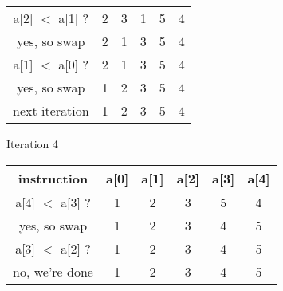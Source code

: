 \documentclass[12pt]{article}
\newenvironment{problem}[2][Problem]{\begin{trivlist}
\item[\hskip \labelsep {\bfseries #1}\hskip \labelsep {\bfseries #2.}]}{\end{trivlist}}
\begin{document}
\begin{problem}{3}
\begin{center}
\begin{tabular}{|c | c c c c c|}
        a[2] $<$ a[1] ? & 2 & 3 & 1 & 5 & 4 \\ 
        yes, so swap & 2 & 1 & 3 & 5 & 4 \\
        a[1] $<$ a[0] ? & 2 & 1 & 3 & 5 & 4 \\ 
        yes, so swap & 1 & 2 & 3 & 5 & 4 \\
        next iteration & 1 & 2 & 3 & 5 & 4 \\
        \hline
    \end{tabular}
\end{center}
Iteration 4
\begin{center}
    \begin{tabular}{|c | c c c c c|} 
        \hline
        instruction & a[0] & a[1] & a[2] & a[3] & a[4]\\
        \hline
        a[4] $<$ a[3] ? & 1 & 2 & 3 & 5 & 4 \\
        yes, so swap & 1 & 2 & 3 & 4 & 5 \\
        a[3] $<$ a[2] ? & 1 & 2 & 3 & 4 & 5 \\
        no, we're done & 1 & 2 & 3 & 4 & 5 \\
        \hline
    \end{tabular}
\end{center}


\end{problem}
 
 
\end{document}
